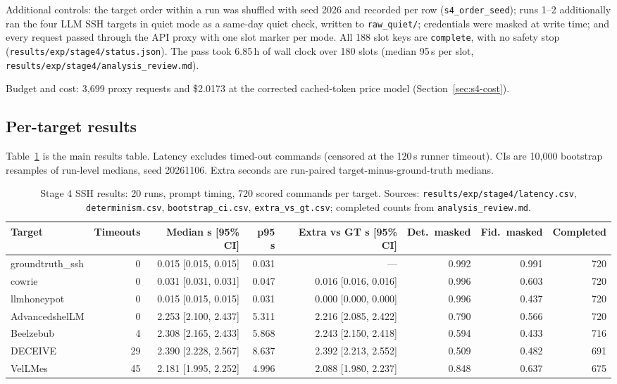 \documentclass[a4paper,11pt]{article}
\begin{document}
Additional controls: the target order within a run was shuffled with seed
2026 and recorded per row (\texttt{s4\_order\_seed}); runs 1--2 additionally
ran the four LLM SSH targets in quiet mode as a same-day quiet check, written
to \texttt{raw\_quiet/}; credentials were masked at write time; and every
request passed through the API proxy with one slot marker per mode. All 188
slot keys are \texttt{complete}, with no safety stop
(\texttt{results/exp/stage4/status.json}). The pass took 6.85\,h of wall clock
over 180 slots (median 95\,s per slot,
\texttt{results/exp/stage4/analysis\_review.md}).

Budget and cost: 3,699 proxy requests and \$2.0173 at the corrected
cached-token price model (Section~\ref{sec:s4-cost}).

\subsection{Per-target results}

Table~\ref{tab:s4-ssh} is the main results table. Latency excludes timed-out
commands (censored at the 120\,s runner timeout). CIs are 10,000 bootstrap
resamples of run-level medians, seed 20261106. Extra seconds are run-paired
target-minus-ground-truth medians.

\begin{table}[ht]
\centering
\caption{Stage 4 SSH results: 20 runs, prompt timing, 720 scored commands per
target. Sources: \texttt{results/exp/stage4/latency.csv},
\texttt{determinism.csv}, \texttt{bootstrap\_ci.csv},
\texttt{extra\_vs\_gt.csv}; completed counts from
\texttt{analysis\_review.md}.}
\label{tab:s4-ssh}
\scriptsize
\setlength{\tabcolsep}{3pt}
\begin{tabular}{@{}l r r r r r r r@{}}
\toprule
Target & Timeouts & Median s [95\% CI] & p95 s & Extra vs GT s [95\% CI] & Det.\ masked & Fid.\ masked & Completed \\
\midrule
groundtruth\_ssh & 0 & 0.015 [0.015, 0.015] & 0.031 & --- & 0.992 & 0.991 & 720 \\
cowrie & 0 & 0.031 [0.031, 0.031] & 0.047 & 0.016 [0.016, 0.016] & 0.996 & 0.603 & 720 \\
llmhoneypot & 0 & 0.015 [0.015, 0.015] & 0.031 & 0.000 [0.000, 0.000] & 0.996 & 0.437 & 720 \\
AdvancedshelLM & 0 & 2.253 [2.100, 2.437] & 5.311 & 2.216 [2.085, 2.422] & 0.790 & 0.566 & 720 \\
Beelzebub & 4 & 2.308 [2.165, 2.433] & 5.868 & 2.243 [2.150, 2.418] & 0.594 & 0.433 & 716 \\
DECEIVE & 29 & 2.390 [2.228, 2.567] & 8.637 & 2.392 [2.213, 2.552] & 0.509 & 0.482 & 691 \\
VelLMes & 45 & 2.181 [1.995, 2.252] & 4.996 & 2.088 [1.980, 2.237] & 0.848 & 0.637 & 675 \\
\bottomrule
\end{tabular}
\end{table}
\end{document}
